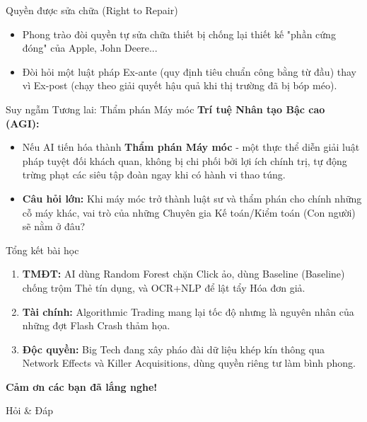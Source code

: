 \documentclass[aspectratio=169]{beamer}
\begin{document}
\begin{frame}{Quyền được sửa chữa (Right to Repair)}
    \begin{itemize}
        \item Phong trào đòi quyền tự sửa chữa thiết bị chống lại thiết kế "phần cứng đóng" của Apple, John Deere...
        \item Đòi hỏi một luật pháp Ex-ante (quy định tiêu chuẩn công bằng từ đầu) thay vì Ex-post (chạy theo giải quyết hậu quả khi thị trường đã bị bóp méo).
    \end{itemize}
\end{frame}

\begin{frame}{Suy ngẫm Tương lai: Thẩm phán Máy móc}
    \textbf{Trí tuệ Nhân tạo Bậc cao (AGI):}
    \begin{itemize}
        \item Nếu AI tiến hóa thành \textbf{Thẩm phán Máy móc} - một thực thể diễn giải luật pháp tuyệt đối khách quan, không bị chi phối bởi lợi ích chính trị, tự động trừng phạt các siêu tập đoàn ngay khi có hành vi thao túng.
        \item \textbf{Câu hỏi lớn:} Khi máy móc trở thành luật sư và thẩm phán cho chính những cỗ máy khác, vai trò của những Chuyên gia Kế toán/Kiểm toán (Con người) sẽ nằm ở đâu?
    \end{itemize}
\end{frame}

\begin{frame}{Tổng kết bài học}
    \begin{enumerate}
        \item \textbf{TMĐT:} AI dùng Random Forest chặn Click ảo, dùng Baseline (Baseline) chống trộm Thẻ tín dụng, và OCR+NLP để lật tẩy Hóa đơn giả.
        \item \textbf{Tài chính:} Algorithmic Trading mang lại tốc độ nhưng là nguyên nhân của những đợt Flash Crash thảm họa.
        \item \textbf{Độc quyền:} Big Tech đang xây pháo đài dữ liệu khép kín thông qua Network Effects và Killer Acquisitions, dùng quyền riêng tư làm bình phong.
    \end{enumerate}
\end{frame}

\begin{frame}
    \centering
    \Huge \textbf{Cảm ơn các bạn đã lắng nghe!}
    
    \vspace{0.5cm}
    \Large Hỏi \& Đáp
\end{frame}
\end{document}

